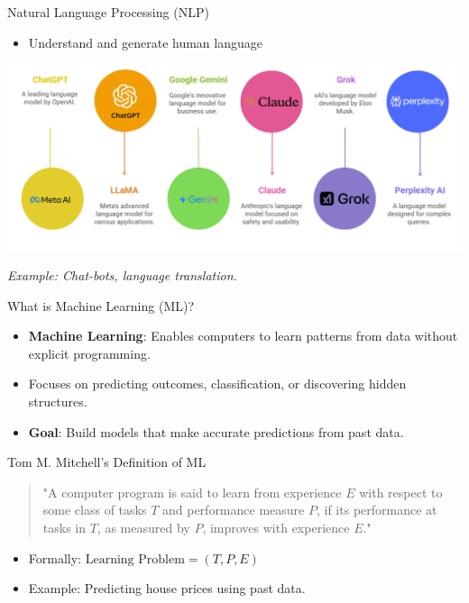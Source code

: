 \documentclass[serif, aspectratio=169]{beamer}
\begin{document}
\begin{frame}{Natural Language Processing (NLP)}
    \begin{itemize}
        \item Understand and generate human language
    \end{itemize}
    \vspace{0.5cm}
    \begin{center}
        \includegraphics[width=0.6\linewidth]{pic/be5.png}
    \end{center}
    \begin{center}
        \textit{Example: Chat-bots, language translation.}
    \end{center}
\end{frame}





\begin{frame}{What is Machine Learning (ML)?}
    \begin{itemize}
        \item \textbf{Machine Learning}: Enables computers to learn patterns from data without explicit programming.
        \item Focuses on predicting outcomes, classification, or discovering hidden structures.
    \vspace{4mm}

        \item \textbf{Goal}: Build models that make accurate predictions from past data.
    \end{itemize}
\end{frame}



\begin{frame}{Tom M. Mitchell's Definition of ML}
    \begin{quote}
    "A computer program is said to learn from experience $E$ with respect to some class of tasks $T$ and performance measure $P$, if its performance at tasks in $T$, as measured by $P$, improves with experience $E$."
    \end{quote}
    \vspace{2mm}
    \begin{itemize}
        \item Formally: $\text{Learning Problem} = (T, P, E)$
        \item Example: Predicting house prices using past data.
    \end{itemize}
\end{frame}
\end{document}
